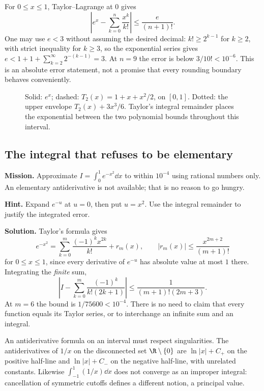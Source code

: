 \begin{examplex}
For $0\le x\le1$, Taylor--Lagrange at $0$ gives
\[
\left|e^x-\sum_{k=0}^{n}\frac{x^k}{k!}\right|\le\frac{e}{(n+1)!}.
\]
One may use $e<3$ without assuming the desired decimal: $k!\ge2^{k-1}$ for $k\ge2$, with strict inequality for $k\ge3$, so the exponential series gives $e<1+1+\sum_{k=2}^{\infty}2^{-(k-1)}=3$. At $n=9$ the error is below $3/10!<10^{-6}$. This is an absolute error statement, not a promise that every rounding boundary behaves conveniently.
\end{examplex}

\begin{figure}[ht]\centering{}
\caption{Solid: $e^x$; dashed: $T_2(x)=1+x+x^2/2$, on $[0,1]$. Dotted: the upper envelope $T_2(x)+3x^3/6$. Taylor's integral remainder places the exponential between the two polynomial bounds throughout this interval.}\end{figure}

\subsection*{The integral that refuses to be elementary}
\textbf{Mission.} Approximate $I=\int_0^1e^{-x^2}\dd x$ to within $10^{-4}$ using rational numbers only. An elementary antiderivative is not available; that is no reason to go hungry.

\textbf{Hint.} Expand $e^{-u}$ at $u=0$, then put $u=x^2$. Use the integral remainder to justify the integrated error.

\textbf{Solution.} Taylor's formula gives
\[
e^{-x^2}=\sum_{k=0}^m\frac{(-1)^kx^{2k}}{k!}+r_m(x),
\qquad |r_m(x)|\le\frac{x^{2m+2}}{(m+1)!}
\]
for $0\le x\le1$, since every derivative of $e^{-u}$ has absolute value at most $1$ there. Integrating the \emph{finite} sum,
\[
\left|I-\sum_{k=0}^m\frac{(-1)^k}{k!(2k+1)}\right|
\le\frac1{(m+1)!(2m+3)}.
\]
At $m=6$ the bound is $1/75600<10^{-4}$. There is no need to claim that every function equals its Taylor series, or to interchange an infinite sum and an integral.

\begin{reminder}
An antiderivative formula on an interval must respect singularities. The antiderivatives of $1/x$ on the disconnected set $\R\setminus\{0\}$ are $\ln|x|+C_+$ on the positive half-line and $\ln|x|+C_-$ on the negative half-line, with unrelated constants. Likewise $\int_{-1}^1(1/x)\dd x$ does not converge as an improper integral: cancellation of symmetric cutoffs defines a different notion, a principal value.
\end{reminder}

